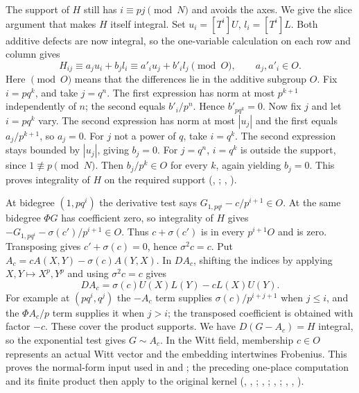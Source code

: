 The support of $H$ still has $i\equiv pj\pmod N$ and avoids the axes.
We give the slice argument that makes $H$ itself integral. Set
$u_i=[T^i]U$, $l_i=[T^i]L$. Both additive defects are now integral,
so the one-variable calculation on each row and column gives
\[
 H_{ij}\equiv a_j u_i+b_j l_i\equiv a'_i u_j+b'_i l_j\pmod O,
 \qquad a_j,a'_i\in O .
\]
Here $\pmod O$ means that the differences lie in the additive subgroup
$O$. Fix $i=p q^k$, and take $j=q^n$. The first expression has norm
at most $p^{k+1}$ independently of $n$; the second equals $b'_i/p^n$.
Hence $b'_{p q^k}=0$. Now fix $j$ and let $i=p q^k$ vary. The second
expression has norm at most $|u_j|$ and the first equals $a_j/p^{k+1}$,
so $a_j=0$. For $j$ not a power of $q$, take $i=q^k$. The second
expression stays bounded by $|u_j|$, giving $b_j=0$. For $j=q^n$,
$i=q^k$ is outside the support, since $1\not\equiv p\pmod N$.
Then $b_j/p^k\in O$ for every $k$, again yielding $b_j=0$.
This proves integrality of $H$ on the required support
(, ;
, ).

At bidegree $(1,pq^i)$ the derivative test says
$G_{1,pq^i}-c/p^{i+1}\in O$. At the same bidegree $\Phi G$ has
coefficient zero, so integrality of $H$ gives
$-G_{1,pq^i}-\sigma(c')/p^{i+1}\in O$. Thus $c+\sigma(c')$ is
in every $p^{i+1}O$ and is zero. Transposing gives
$c'+\sigma(c)=0$, hence $\sigma^2 c=c$. Put
$A_c=cA(X,Y)-\sigma(c)A(Y,X)$. In $DA_c$, shifting the indices by
applying $X,Y\mapsto X^p,Y^p$ and using $\sigma^2c=c$ gives
\[
                 DA_c=\sigma(c)U(X)L(Y)-cL(X)U(Y).
\]
For example at $(p q^i,q^j)$ the $-A_c$ term supplies
$\sigma(c)/p^{i+j+1}$ when $j\le i$, and the $\Phi A_c/p$ term
supplies it when $j>i$; the transposed coefficient is obtained with
factor $-c$. These cover the product supports. We have
$D(G-A_c)=H$ integral, so the exponential test gives $G\sim A_c$.
In the Witt field, membership $c\in O$ represents an actual Witt
vector and the embedding intertwines Frobenius. This proves the
normal-form input used in  and ;
the preceding one-place computation and its finite product then apply
to the original kernel
(, ,
;
, ;
, ;
, ,
).


